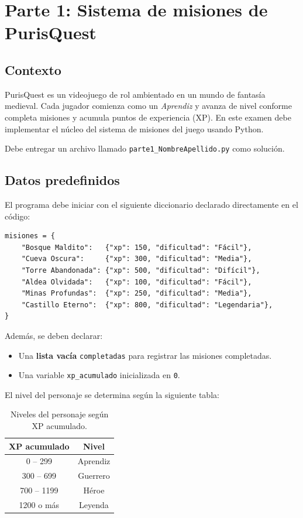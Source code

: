 \section*{Parte 1: Sistema de misiones de PurisQuest}

\subsection*{{\small \faDragon}\; Contexto}

PurisQuest es un videojuego de rol ambientado en un mundo de fantasía medieval.
Cada jugador comienza como un \emph{Aprendiz} y avanza de nivel conforme completa misiones y acumula puntos de experiencia (XP).
En este examen debe implementar el núcleo del sistema de misiones del juego usando Python.

Debe entregar un archivo llamado \texttt{parte1\_NombreApellido.py} como solución.

\subsection*{{\small \faDatabase}\; Datos predefinidos}

El programa debe iniciar con el siguiente diccionario declarado directamente en el código:

\begin{verbatim}
misiones = {
    "Bosque Maldito":   {"xp": 150, "dificultad": "Fácil"},
    "Cueva Oscura":     {"xp": 300, "dificultad": "Media"},
    "Torre Abandonada": {"xp": 500, "dificultad": "Difícil"},
    "Aldea Olvidada":   {"xp": 100, "dificultad": "Fácil"},
    "Minas Profundas":  {"xp": 250, "dificultad": "Media"},
    "Castillo Eterno":  {"xp": 800, "dificultad": "Legendaria"},
}
\end{verbatim}

Además, se deben declarar:

\begin{itemize}
    \item Una \textbf{lista vacía} \texttt{completadas} para registrar las misiones completadas.
    \item Una variable \texttt{xp_acumulado} inicializada en \texttt{0}.
\end{itemize}

El nivel del personaje se determina según la siguiente tabla:

\begin{table}[H]
    \centering
    \begin{tabular}{cc}
        \toprule
        \textbf{XP acumulado} & \textbf{Nivel} \\
        \midrule
        0 -- 299    & Aprendiz \\
        300 -- 699  & Guerrero \\
        700 -- 1199 & Héroe \\
        1200 o más  & Leyenda \\
        \bottomrule
    \end{tabular}
    \caption{Niveles del personaje según XP acumulado.}
    \label{tab:niveles}
\end{table}

